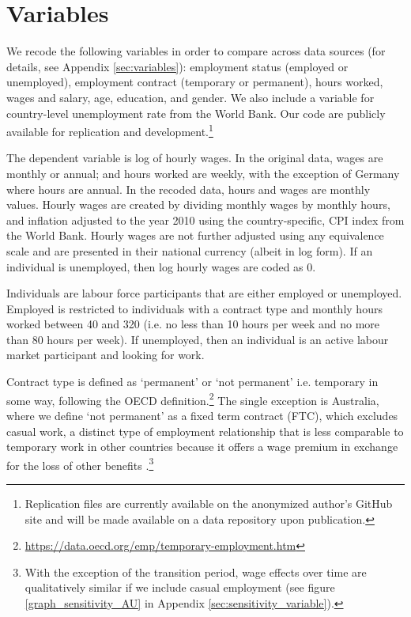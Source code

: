 \documentclass[12pt]{article}
\begin{document}
\section{Variables}

We recode the following variables in order to compare across data sources (for details, see Appendix \ref{sec:variables}): employment status (employed or unemployed), employment contract (temporary or permanent), hours worked, wages and salary, age, education, and gender.  We also include a variable for country-level unemployment rate from the World Bank.  Our code are publicly available for replication and development.\footnote{Replication files are currently available on the anonymized author's GitHub site and will be made available on a data repository upon publication.} 

The dependent variable is log of hourly wages.  In the original data, wages are monthly or annual; and hours worked are weekly, with the exception of Germany where hours are annual.  In the recoded data, hours and wages are monthly values.  Hourly wages are created by dividing monthly wages by monthly hours, and inflation adjusted to the year 2010 using the country-specific, CPI index from the World Bank.  Hourly wages are not further adjusted using any equivalence scale and are presented in their national currency (albeit in log form).  If an individual is unemployed, then log hourly wages are coded as 0.

Individuals are labour force participants that are either employed or unemployed.  Employed is restricted to individuals with a contract type and monthly hours worked between 40 and 320 (i.e. no less than 10 hours per week and no more than 80 hours per week).  If unemployed, then an individual is an active labour market participant and looking for work.

Contract type is defined as `permanent' or `not permanent' i.e. temporary in some way, following the OECD definition.\footnote{\url{https://data.oecd.org/emp/temporary-employment.htm}}  The single exception is Australia, where we define `not permanent' as a fixed term contract (FTC), which excludes casual work, a distinct type of employment relationship that is less comparable to temporary work in other countries because it offers a wage premium in exchange for the loss of other benefits \citep{mooi-reci_casual_2017}.\footnote{With the exception of the transition period, wage effects over time are qualitatively similar if we include casual employment (see figure \ref{graph_sensitivity_AU} in Appendix \ref{sec:sensitivity_variable}).}
\end{document}
